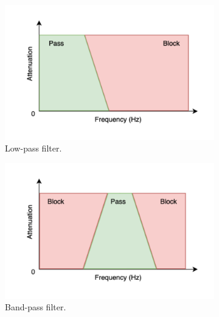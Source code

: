 \begin{figure}[t]
    \centering
    \begin{subfigure}{0.45\textwidth}
        \centering
        \includegraphics[width=\textwidth]{../images/pipeline/lowpass_filter.pdf}
        \captionsetup{width=\linewidth}
        \captionsetup{justification=centering}
        \caption{Low-pass filter.}
        \label{fig:processing_signals_filters_lowpass}
    \end{subfigure}
    \hfill
    \begin{subfigure}{0.45\textwidth}
        \centering
        \includegraphics[width=\textwidth]{../images/pipeline/bandpass_filter.pdf}
        \captionsetup{width=\linewidth}
        \captionsetup{justification=centering}
        \caption{Band-pass filter.}
        \label{fig:processing_signals_filters_bandpass}
    \end{subfigure}
    \hfill
    \begin{subfigure}{0.45\textwidth}

\end{subfigure}
\end{figure}
